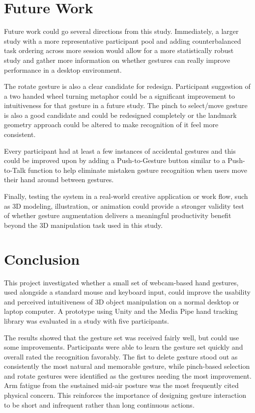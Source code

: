\documentclass[manuscript]{acmart}
\begin{document}
\section{Future Work}

Future work could go several directions from this study. Immediately, a larger study with a more representative participant pool and adding counterbalanced task ordering across more session would allow for a more statistically robust study and gather more information on whether gestures can really improve performance in a desktop environment. 

The rotate gesture is also a clear candidate for redesign. Participant suggestion of a two handed wheel turning metaphor could be a significant improvement to intuitiveness for that gesture in a future study. The pinch to select/move gesture is also a good candidate and could be redesigned completely or the landmark geometry approach could be altered to make recognition of it feel more consistent.

Every participant had at least a few instances of accidental gestures and this could be improved upon by adding a Push-to-Gesture button similar to a Push-to-Talk function to help eliminate mistaken gesture recognition when users move their hand around between gestures.

Finally, testing the system in a real-world creative application or work flow, such as 3D modeling, illustration, or animation could provide a stronger validity test of whether gesture augmentation delivers a meaningful productivity benefit beyond the 3D manipulation task used in this study.

\section{Conclusion}
This project investigated whether a small set of webcam-based hand gestures, used alongside a standard mouse and keyboard input, could improve the usability and perceived intuitiveness of 3D object manipulation on a normal desktop or laptop computer. A prototype using Unity and the Media Pipe hand tracking library was evaluated in a study with five participants.

The results showed that the gesture set was received fairly well, but could use some improvements. Participants were able to learn the gesture set quickly and overall rated the recognition favorably. The fist to delete gesture stood out as consistently the most natural and memorable gesture, while pinch-based selection and rotate gestures were identified as the gestures needing the most improvement. Arm fatigue from the sustained mid-air posture was the most frequently cited physical concern. This reinforces the importance of designing gesture interaction to be short and infrequent rather than long continuous actions.
\end{document}
